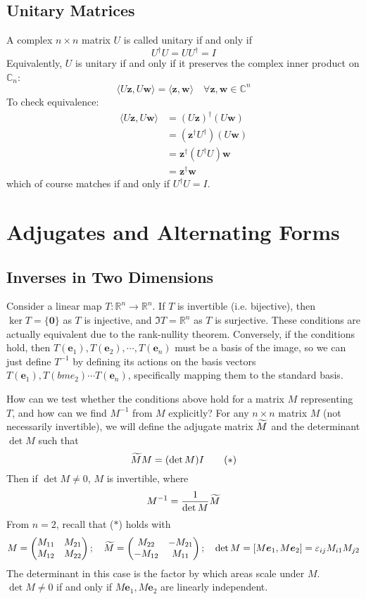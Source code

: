 \documentclass{article}
\begin{document}
\subsection{Unitary Matrices}
A complex $n \times n$ matrix $U$ is called unitary if and only if
\[ U^\dagger U = U U^\dagger = I \]
Equivalently, $U$ is unitary if and only if it preserves the complex inner product on $\mathbb C_n$:
\[ \langle U \bm z, U \bm w \rangle = \langle \bm z, \bm w \rangle\quad \forall \bm z, \bm w \in \mathbb C^n \]
To check equivalence:
\begin{align*}
	\langle U \bm z, U \bm w \rangle & = (U \bm z)^\dagger (U \bm w)         \\
	                                 & = (\bm z^\dagger U^\dagger) (U \bm w) \\
	                                 & = \bm z^\dagger (U^\dagger U) \bm w   \\
	                                 & = \bm z^\dagger \bm w
\end{align*}
which of course matches if and only if $U^\dagger U = I$.

\section{Adjugates and Alternating Forms}
\subsection{Inverses in Two Dimensions}
Consider a linear map $T\colon \mathbb R^n \to \mathbb R^n$. If $T$ is invertible (i.e. bijective), then $\ker T = \{ \bm 0 \}$ as $T$ is injective, and $\Im T = \mathbb R^n$ as $T$ is surjective. These conditions are actually equivalent due to the rank-nullity theorem. Conversely, if the conditions hold, then $T(\bm e_1), T(\bm e_2), \cdots, T(\bm e_n)$ must be a basis of the image, so we can just define $T^{-1}$ by defining its actions on the basis vectors $T(\bm e_1), T(bm e_2) \cdots T(\bm e_n)$, specifically mapping them to the standard basis.

How can we test whether the conditions above hold for a matrix $M$ representing $T$, and how can we find $M^{-1}$ from $M$ explicitly? For any $n \times n$ matrix $M$ (not necessarily invertible), we will define the adjugate matrix $\widetilde{M}$ and the determinant $\det M$ such that
\[ \widetilde{M} M = (\det M) I \tag{$\ast$} \]
Then if $\det M \neq 0$, $M$ is invertible, where
\[ M^{-1} = \frac{1}{\det M}\widetilde{M} \]
From $n=2$, recall that ($\ast$) holds with
\[ M = \begin{pmatrix}
		M_{11} & M_{21} \\
		M_{12} & M_{22}
	\end{pmatrix};\quad \widetilde{M} = \begin{pmatrix}
		M_{22}  & -M_{21} \\
		-M_{12} & M_{11}
	\end{pmatrix};\quad \det M = [M\bm e_1, M\bm e_2] = \varepsilon_{ij}M_{i1}M_{j2} \]
The determinant in this case is the factor by which areas scale under $M$. $\det M \neq 0$ if and only if $M\bm e_1, M\bm e_2$ are linearly independent.
\end{document}
